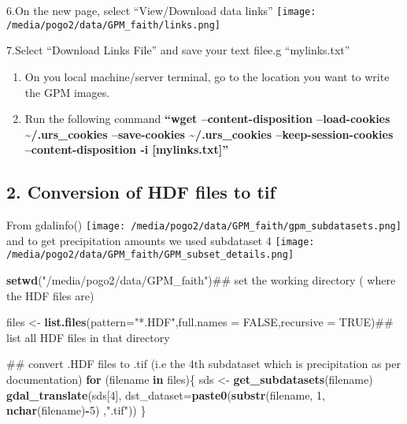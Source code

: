 \documentclass[]{article}
\newenvironment{Shaded}{\begin{snugshade}}{\end{snugshade}}
\newcommand{\KeywordTok}[1]{\textcolor[rgb]{0.13,0.29,0.53}{\textbf{#1}}}
\newcommand{\DataTypeTok}[1]{\textcolor[rgb]{0.13,0.29,0.53}{#1}}
\newcommand{\DecValTok}[1]{\textcolor[rgb]{0.00,0.00,0.81}{#1}}
\newcommand{\StringTok}[1]{\textcolor[rgb]{0.31,0.60,0.02}{#1}}
\newcommand{\OtherTok}[1]{\textcolor[rgb]{0.56,0.35,0.01}{#1}}
\newcommand{\ControlFlowTok}[1]{\textcolor[rgb]{0.13,0.29,0.53}{\textbf{#1}}}
\newcommand{\OperatorTok}[1]{\textcolor[rgb]{0.81,0.36,0.00}{\textbf{#1}}}
\newcommand{\NormalTok}[1]{#1}
\begin{document}
6.On the new page, select ``View/Download data links''
\texttt{[image: /media/pogo2/data/GPM\_faith/links.png]}

7.Select ``Download Links File'' and save your text filee.g
``mylinks.txt''

\begin{enumerate}
\def\labelenumi{\arabic{enumi}.}
\setcounter{enumi}{7}
\item
  On you local machine/server terminal, go to the location you want to
  write the GPM images.
\item
  Run the following command \textbf{``wget --content-disposition
  --load-cookies \textasciitilde{}/.urs\_cookies --save-cookies
  \textasciitilde{}/.urs\_cookies --keep-session-cookies
  --content-disposition -i {[}mylinks.txt{]}''}
\end{enumerate}

\subsection{2. Conversion of HDF files to
tif}\label{conversion-of-hdf-files-to-tif}

From gdalinfo()
\texttt{[image: /media/pogo2/data/GPM\_faith/gpm\_subdatasets.png]} and to
get precipitation amounts we used subdataset 4
\texttt{[image: /media/pogo2/data/GPM\_faith/GPM\_subset\_details.png]}

\begin{Shaded}
\begin{Highlighting}[]
\KeywordTok{setwd}\NormalTok{(}\StringTok{"/media/pogo2/data/GPM_faith"}\NormalTok{)## set the working directory ( where the HDF files are)}

\NormalTok{files <-}\StringTok{ }\KeywordTok{list.files}\NormalTok{(}\DataTypeTok{pattern=}\StringTok{"*.HDF"}\NormalTok{,}\DataTypeTok{full.names =} \OtherTok{FALSE}\NormalTok{,}\DataTypeTok{recursive =} \OtherTok{TRUE}\NormalTok{)## list all HDF files in that directory}

\NormalTok{## convert .HDF files to .tif (i.e the 4th subdataset which is precipitation as per documentation)}
\ControlFlowTok{for}\NormalTok{ (filename }\ControlFlowTok{in}\NormalTok{ files)\{}
\NormalTok{  sds <-}\StringTok{ }\KeywordTok{get_subdatasets}\NormalTok{(filename)}
  \KeywordTok{gdal_translate}\NormalTok{(sds[}\DecValTok{4}\NormalTok{], }\DataTypeTok{dst_dataset=}\KeywordTok{paste0}\NormalTok{(}\KeywordTok{substr}\NormalTok{(filename, }\DecValTok{1}\NormalTok{, }\KeywordTok{nchar}\NormalTok{(filename)}\OperatorTok{-}\DecValTok{5}\NormalTok{) ,}\StringTok{".tif"}\NormalTok{))}
\NormalTok{\}}
\end{Highlighting}
\end{Shaded}
\end{document}
